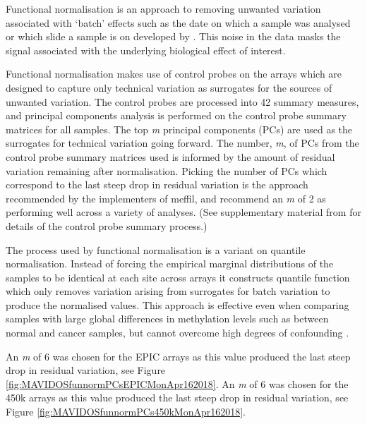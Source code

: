 \documentclass[]{book}
\begin{document}
Functional normalisation is an approach to removing unwanted variation associated with `batch' effects such as the date on which a sample was analysed or which slide a sample is on developed by \citet{Fortin2014}. This noise in the data masks the signal associated with the underlying biological effect of interest.

Functional normalisation makes use of control probes on the arrays which are designed to capture only technical variation as surrogates for the sources of unwanted variation. The control probes are processed into 42 summary measures, and principal components analysis is performed on the control probe summary matrices for all samples. The top \emph{m} principal components (PCs) are used as the surrogates for technical variation going forward. The number, \emph{m}, of PCs from the control probe summary matrices used is informed by the amount of residual variation remaining after normalisation. Picking the number of PCs which correspond to the last steep drop in residual variation is the approach recommended by the implementers of meffil, and \citet{Fortin2014} recommend an \emph{m} of 2 as performing well across a variety of analyses. (See supplementary material from \citep{Fortin2014} for details of the control probe summary process.)

The process used by functional normalisation is a variant on quantile normalisation. Instead of forcing the empirical marginal distributions of the samples to be identical at each site across arrays it constructs quantile function which only removes variation arising from surrogates for batch variation to produce the normalised values. This approach is effective even when comparing samples with large global differences in methylation levels such as between normal and cancer samples, but cannot overcome high degrees of confounding \citep{Fortin2014}.

An \emph{m} of 6 was chosen for the EPIC arrays as this value produced the last steep drop in residual variation, see Figure \ref{fig:MAVIDOSfunnormPCsEPICMonApr162018}. An \emph{m} of 6 was chosen for the 450k arrays as this value produced the last steep drop in residual variation, see Figure \ref{fig:MAVIDOSfunnormPCs450kMonApr162018}.
\end{document}
